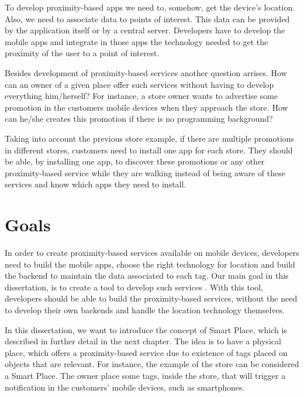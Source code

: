 To develop proximity-based apps we need to, somehow, get the device's location.
Also, we need to associate data to points of interest.
This data can be provided by the application itself or by a central server.
Developers have to develop the mobile apps and integrate in those apps the technology needed to get the proximity of the user to a point of interest.

Besides development of proximity-based services another question arrises.
How can an owner of a given place offer such services without having to develop everything him/herself?
For instance, a store owner wants to advertise some promotion in the customers mobile devices when they approach the store.
How can he/she creates this promotion if there is no programming background?

Taking into account the previous store example, if there are multiple promotions in different stores, customers need to install one app for each store.
They should be able, by installing one app, to discover these promotions or any other proximity-based service while they are walking instead of being aware of these services and know which apps they need to install.

\section{Goals}
\label{sec:introduction_goals}
In order to create proximity-based services available on mobile devices, developers need to build the mobile apps, choose the right technology for location and build the backend to maintain the data associated to each tag.
Our main goal in this dissertation, is to create a tool to develop such services%
.
With this tool, developers should be able to build the proximity-based services, without the need to develop their own backends and handle the location technology themselves.

In this dissertation, we want to introduce the concept of Smart Place, which is described in further detail in the next chapter.
The idea is to have a physical place, which offers a proximity-based service due to existence of tags placed on objects that are relevant.
For instance, the example of the store can be considered a Smart Place.
The owner place some tags, inside the store, that will trigger a notification in the customers' mobile devices, such as smartphones.

